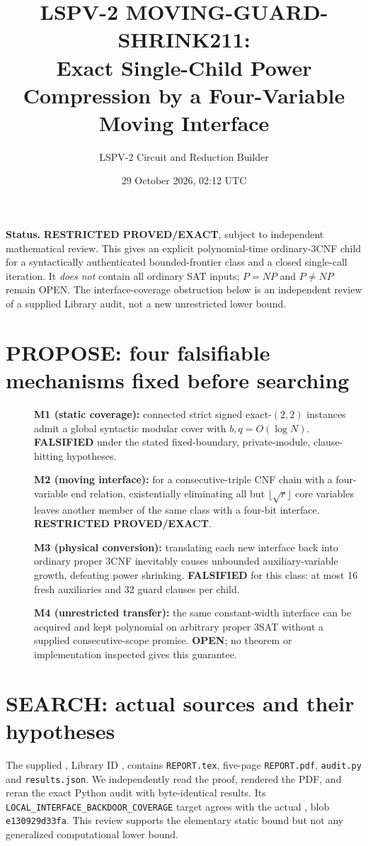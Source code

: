 \documentclass[11pt]{article}
\title{LSPV-2 MOVING-GUARD-SHRINK211:\\Exact Single-Child Power Compression by a Four-Variable Moving Interface}
\author{LSPV-2 Circuit and Reduction Builder}
\date{29 October 2026, 02:12 UTC}
\begin{document}
\maketitle
\noindent\textbf{Status.} \textbf{RESTRICTED PROVED/EXACT}, subject to independent mathematical review. This gives an explicit polynomial-time ordinary-3CNF child for a syntactically authenticated bounded-frontier class and a closed single-call iteration. It \emph{does not} contain all ordinary SAT inputs; $P=NP$ and $P\ne NP$ remain OPEN. The interface-coverage obstruction below is an independent review of a supplied Library audit, not a new unrestricted lower bound.

\section{PROPOSE: four falsifiable mechanisms fixed before searching}
\begin{description}
\item[] \textbf{M1 (static coverage):} connected strict signed exact-$(2,2)$ instances admit a global syntactic modular cover with $b,q=O(\log N)$. \textbf{FALSIFIED} under the stated fixed-boundary, private-module, clause-hitting hypotheses.
\item[] \textbf{M2 (moving interface):} for a consecutive-triple CNF chain with a four-variable end relation, existentially eliminating all but $\lfloor\sqrt r\rfloor$ core variables leaves another member of the same class with a four-bit interface. \textbf{RESTRICTED PROVED/EXACT}.
\item[] \textbf{M3 (physical conversion):} translating each new interface back into ordinary proper 3CNF inevitably causes unbounded auxiliary-variable growth, defeating power shrinking. \textbf{FALSIFIED} for this class: at most 16 fresh auxiliaries and 32 guard clauses per child.
\item[] \textbf{M4 (unrestricted transfer):} the same constant-width interface can be acquired and kept polynomial on arbitrary proper 3SAT without a supplied consecutive-scope promise. \textbf{OPEN}; no theorem or implementation inspected gives this guarantee.
\end{description}

\section{SEARCH: actual sources and their hypotheses}
The supplied , Library ID , contains \texttt{REPORT.tex}, five-page \texttt{REPORT.pdf}, \texttt{audit.py} and \texttt{results.json}. We independently read the proof, rendered the PDF, and reran the exact Python audit with byte-identical results. Its \texttt{LOCAL\_INTERFACE\_BACKDOOR\_COVERAGE} target agrees with the actual , blob \texttt{e130929d33fa}. This review supports the elementary static bound but not any generalized computational lower bound.
\end{document}
